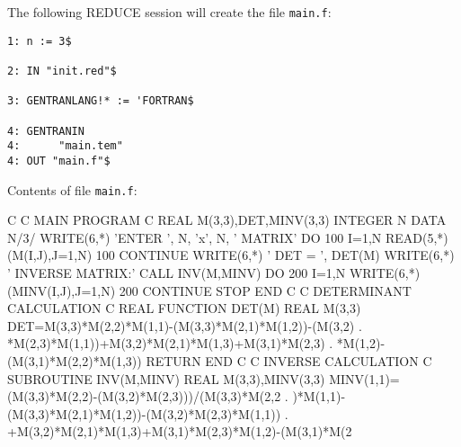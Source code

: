 The following REDUCE session will create the file {\tt main.f}:
\begin{verbatim}
1: n := 3$ 

2: IN "init.red"$ 

3: GENTRANLANG!* := 'FORTRAN$ 

4: GENTRANIN 
4:      "main.tem" 
4: OUT "main.f"$ 
\end{verbatim}
Contents of file {\tt main.f}:
\begin{framedverbatim}
C                                                         
C  MAIN PROGRAM                                           
C                                                         
      REAL M(3,3),DET,MINV(3,3)                         
      INTEGER N                                           
      DATA N/3/                                           
      WRITE(6,*) 'ENTER ', N, 'x', N, ' MATRIX'           
      DO 100 I=1,N                                        
          READ(5,*) (M(I,J),J=1,N)                        
100   CONTINUE                                            
      WRITE(6,*) ' DET = ', DET(M)                        
      WRITE(6,*) ' INVERSE MATRIX:'                       
      CALL INV(M,MINV)                                    
      DO 200 I=1,N                                        
          WRITE(6,*) (MINV(I,J),J=1,N)                    
200   CONTINUE                                            
      STOP                                                
      END                                                 
C                                                         
C  DETERMINANT CALCULATION                                
C                                                         
      REAL FUNCTION DET(M)                              
      REAL M(3,3)                                       
      DET=M(3,3)*M(2,2)*M(1,1)-(M(3,3)*M(2,1)*M(1,2))-(M(3,2)
     . *M(2,3)*M(1,1))+M(3,2)*M(2,1)*M(1,3)+M(3,1)*M(2,3)
     . *M(1,2)-(M(3,1)*M(2,2)*M(1,3))
      RETURN                                              
      END                                                 
C                                                         
C  INVERSE CALCULATION                                    
C                                                         
      SUBROUTINE INV(M,MINV)                              
      REAL M(3,3),MINV(3,3)                             
      MINV(1,1)=(M(3,3)*M(2,2)-(M(3,2)*M(2,3)))/(M(3,3)*M(2,2
     . )*M(1,1)-(M(3,3)*M(2,1)*M(1,2))-(M(3,2)*M(2,3)*M(1,1))
     . +M(3,2)*M(2,1)*M(1,3)+M(3,1)*M(2,3)*M(1,2)-(M(3,1)*M(2

\end{framedverbatim}
